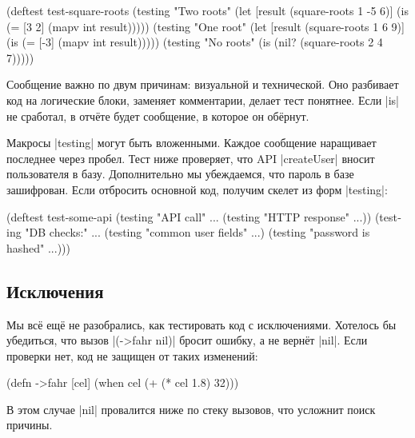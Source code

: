\begin{english}
  \begin{clojure}
(deftest test-square-roots
  (testing "Two roots"
    (let [result (square-roots 1 -5 6)]
      (is (= [3 2] (mapv int result)))))
  (testing "One root"
    (let [result (square-roots 1 6 9)]
      (is (= [-3] (mapv int result)))))
  (testing "No roots"
    (is (nil? (square-roots 2 4 7)))))
  \end{clojure}
\end{english}

Сообщение важно по двум причинам: визуальной и технической. Оно разбивает код на
логические блоки, заменяет комментарии, делает тест понятнее. Если \spverb|is|
не сработал, в отч\"{е}те будет сообщение, в которое он об\"{е}рнут.

Макросы \spverb|testing| могут быть вложенными. Каждое сообщение наращивает
последнее через пробел. Тест ниже проверяет, что API \spverb|createUser| вносит
пользователя в базу. Дополнительно мы убеждаемся, что пароль в базе
зашифрован. Если отбросить основной код, получим скелет из форм
\spverb|testing|:

\begin{english}
  \begin{clojure}
(deftest test-some-api
  (testing "API call" ...
    (testing "HTTP response" ...))
  (testing "DB checks:" ...
    (testing "common user fields" ...)
    (testing "password is hashed" ...)))
  \end{clojure}
\end{english}

\subsection{Исключения}


Мы вс\"{е} ещ\"{е} не разобрались, как тестировать код с исключениями. Хотелось бы
убедиться, что вызов \spverb|(->fahr nil)| бросит ошибку, а не верн\"{е}т
\spverb|nil|. Если проверки нет, код не защищен от таких изменений:

\begin{english}
  \begin{clojure}
(defn ->fahr [cel]
  (when cel
    (+ (* cel 1.8) 32)))
  \end{clojure}
\end{english}


В этом случае \spverb|nil| провалится ниже по стеку вызовов, что усложнит поиск
причины.

